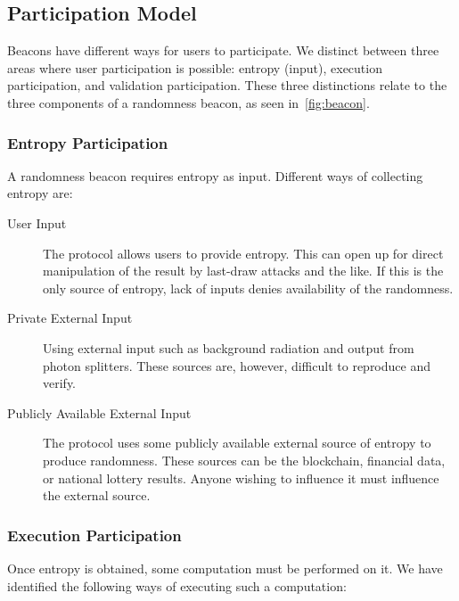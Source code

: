 \subsection{Participation Model}
\label{sub:participation_model}
Beacons have different ways for users to participate. We distinct between three areas where user participation is possible: entropy (input), execution participation, and validation participation. These three distinctions relate to the three components of a randomness beacon, as seen in~\vref{fig:beacon}.

\subsubsection{Entropy Participation}
A randomness beacon requires entropy as input. Different ways of collecting entropy are:
   
\begin{description}
    \item [User Input] The protocol allows users to provide entropy. This can open up for direct manipulation of the result by last-draw attacks and the like. If this is the only source of entropy, lack of inputs denies availability of the randomness.
    \item [Private External Input] Using external input such as background radiation and output from photon splitters. These sources are, however, difficult to reproduce and verify.
    \item [Publicly Available External Input] The protocol uses some publicly available external source of entropy to produce randomness. These sources can be the blockchain, financial data, or national lottery results. Anyone wishing to influence it must influence the external source. 
\end{description}

\subsubsection{Execution Participation}
Once entropy is obtained, some computation must be performed on it. We have identified the following ways of executing such a computation:

